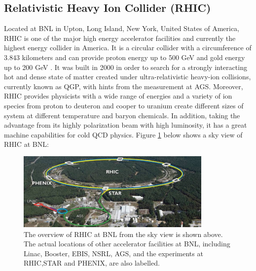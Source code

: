 
\subsection{Relativistic Heavy Ion Collider (RHIC)}

Located at BNL in Upton, Long Island, New York, United States of America, RHIC is one of the major high energy accelerator facilities and currently the highest energy collider in America. It is a circular collider with a circumference of 3.843 kilometers and can provide proton energy up to 500 GeV and gold energy up to 200 GeV \cite{RHICReport}. It was built in 2000 in order to search for a strongly interacting hot and dense state of matter created under ultra-relativistic heavy-ion collisions, currently known as QGP, with hints from the measurement at AGS. Moreover, RHIC provides physicists with a wide range of energies and a variety of ion species from proton to deuteron and cooper to uranium create different sizes of system at different temperature and baryon chemicals. In addition, taking the advantage from its highly polarization beam with high luminosity, it has a great machine capabilities for cold QCD physics. Figure \ref{RHIC} below shows a sky view of RHIC at BNL:


\begin{figure}[hbtp]
\begin{center}
\includegraphics[width=0.85\textwidth]{Figures/Chapter1/RHIC.jpg}
\caption{The overview of RHIC at BNL from the sky view is shown above. The actual locations of other accelerator facilities at BNL, including Linac, Booster, EBIS, NSRL, AGS, and the experiments at RHIC,STAR and PHENIX, are also labelled.}
\label{RHIC}
\end{center}
\end{figure} 


